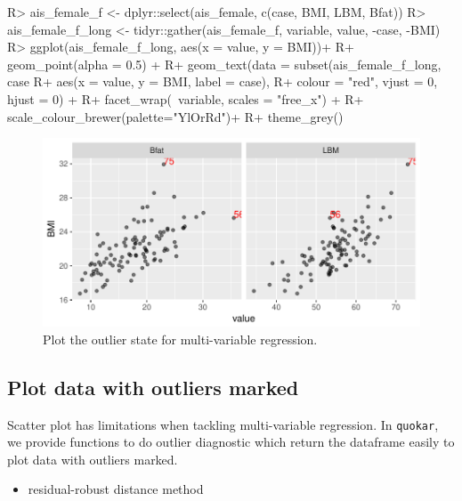 \documentclass[article]{jss}
\providecommand{\tightlist}{%
  \setlength{\itemsep}{0pt}\setlength{\parskip}{0pt}}
\theoremstyle{definition}
\theoremstyle{definition}
\theoremstyle{remark}
\begin{document}
\begin{CodeChunk}

\begin{CodeInput}
R> ais_female_f <- dplyr::select(ais_female, c(case, BMI, LBM, Bfat))
R> ais_female_f_long <- tidyr::gather(ais_female_f, variable, value, -case, -BMI)
R> ggplot(ais_female_f_long, aes(x = value, y = BMI))+
R+   geom_point(alpha = 0.5) +
R+   geom_text(data = subset(ais_female_f_long, case %
R+                           aes(x = value, y = BMI, label = case), 
R+             colour = "red", vjust = 0, hjust = 0) +
R+   facet_wrap(~variable, scales = "free_x") +
R+   scale_colour_brewer(palette="YlOrRd")+
R+   theme_grey()
\end{CodeInput}
\begin{figure}

{\centering \includegraphics{Diagnosing_outliers_and_visualization_of_quantile_regression_models_files/figure-latex/multi-case-1} 

}

\caption[Plot the outlier state for multi-variable regression]{Plot the outlier state for multi-variable regression.}\label{fig:multi-case}
\end{figure}
\end{CodeChunk}

\subsection{Plot data with outliers
marked}\label{plot-data-with-outliers-marked}

Scatter plot has limitations when tackling multi-variable regression. In
\texttt{quokar}, we provide functions to do outlier diagnostic which
return the dataframe easily to plot data with outliers marked.

\begin{itemize}
\tightlist
\item
  residual-robust distance method
\end{itemize}
\end{document}

